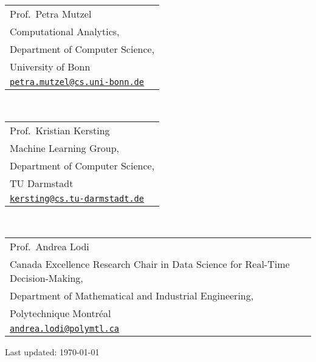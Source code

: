 \documentclass[11pt, a4paper, DIV=12]{scrartcl}
\begin{document}
\begin{tabular}{l}
Prof.~Petra Mutzel\\
Computational Analytics,\\ 
Department of Computer Science,\\
University of Bonn \\
\href{mailto:petra.mutzel@cs.uni-bonn.de}{\texttt{petra.mutzel@cs.uni-bonn.de}}\\
\end{tabular}\\[0.5em]

\begin{tabular}{l}
Prof.~Kristian Kersting\\ 
Machine Learning Group,\\
Department of Computer Science,\\
TU Darmstadt\\
\href{mailto:kersting@cs.tu-darmstadt.de}{\texttt{kersting@cs.tu-darmstadt.de}}\\
\end{tabular}\\[0.5em]

\begin{tabular}{l}
Prof.~Andrea Lodi\\
Canada Excellence Research Chair in Data Science for Real-Time Decision-Making,\\ 
Department of Mathematical and Industrial Engineering,\\
Polytechnique Montréal \\
\href{mailto:andrea.lodi@polymtl.ca}{\texttt{andrea.lodi@polymtl.ca}}\\
\end{tabular}

\vfill{} 
\begin{center}
{\scriptsize Last updated: \today}
\end{center}
\end{document}
